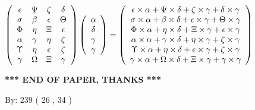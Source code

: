 \documentclass[12pt]{article}
\begin{document}
$  %
 \left( \begin{array}
 {
 c
 c
 c
 c
 }
 \epsilon & 
 \Psi & 
                    \zeta & 
 \delta \\ 
 \sigma & 
 \beta & 
 \epsilon & 
 \Theta \\ 
 \Phi & 
 \eta & 
                    \Xi & 
 \epsilon \\ 
 \alpha & 
 \gamma & 
 \eta & 
                    \zeta \\ 
 \Upsilon & 
 \eta & 
 \epsilon & 
                    \zeta \\ 
 \gamma & 
 \Omega & 
                    \Xi & 
 \gamma
 \end{array} \right)
 \left( \begin{array}
 {
 c
 }
 \alpha \\ 
 \delta \\ 
 \gamma \\ 
 \gamma
 \end{array} \right)
=
  \left( \begin{array}
 {
 c
 }
 \epsilon \times  \alpha   +  \Psi \times  \delta   +                     \zeta \times  \gamma   +  \delta \times  \gamma \\ 
 \sigma \times  \alpha   +  \beta \times  \delta   +  \epsilon \times  \gamma   +  \Theta \times  \gamma \\ 
 \Phi \times  \alpha   +  \eta \times  \delta   +                     \Xi \times  \gamma   +  \epsilon \times  \gamma \\ 
 \alpha \times  \alpha   +  \gamma \times  \delta   +  \eta \times  \gamma   +                     \zeta \times  \gamma \\ 
 \Upsilon \times  \alpha   +  \eta \times  \delta   +  \epsilon \times  \gamma   +                     \zeta \times  \gamma \\ 
 \gamma \times  \alpha   +  \Omega \times  \delta   +                     \Xi \times  \gamma   +  \gamma \times  \gamma
 \end{array} \right)
$
 
 
 
   
   
 \vspace{0.2in}
 
   
   
   
   
\vspace{1.0in} 
{\textbf{\large{ *** END OF PAPER, THANKS *** }}} 
   
   
\hspace{1.0in} By: 
 239 ( 26 ,  34 )
   
\end{document}
